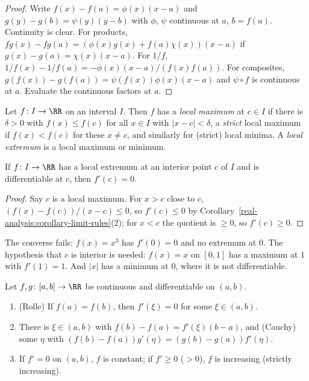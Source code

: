 \begin{proof}
Write $f(x) - f(a) = \phi(x)(x - a)$ and $g(y) - g(b) = \psi(y)(y - b)$ with $\phi$, $\psi$ continuous at $a$, $b = f(a)$. Continuity is clear. For products,
$fg(x) - fg(a) = (\phi(x)g(x) + f(a)\chi(x))(x - a)$ if $g(x) - g(a) = \chi(x)(x - a)$. For $1/f$, $1/f(x) - 1/f(a) = -\phi(x)(x - a)/(f(x)f(a))$. For composites,
$g(f(x)) - g(f(a)) = \psi(f(x))\phi(x)(x - a)$ and $\psi \circ f$ is continuous at $a$. Evaluate the continuous factors at $a$.
\end{proof}

\begin{definition}\label{real-analysis:definition-local-extremum}
Let $f \colon I \to \RR$ on an interval $I$. Then $f$ has a \emph{local maximum} at $c \in I$ if there is $\delta > 0$ with $f(x) \leq f(c)$ for all $x \in I$ with $|x - c| < \delta$, a \emph{strict} local maximum if
$f(x) < f(c)$ for these $x \neq c$, and similarly for (strict) local minima. A \emph{local extremum} is a local maximum or minimum.
\end{definition}

\begin{lemma}[Fermat]\label{real-analysis:lemma-fermat}
If $f \colon I \to \RR$ has a local extremum at an interior point $c$ of $I$ and is differentiable at $c$, then $f'(c) = 0$.
\end{lemma}

\begin{proof}
Say $c$ is a local maximum. For $x > c$ close to $c$, $(f(x) - f(c))/(x - c) \leq 0$, so $f'(c) \leq 0$ by Corollary~\ref{real-analysis:corollary-limit-rules}(2); for $x < c$ the quotient is $\geq 0$, so $f'(c) \geq 0$.
\end{proof}

\begin{counterexample}\label{real-analysis:counterexample-fermat}
The converse fails: $f(x) = x^3$ has $f'(0) = 0$ and no extremum at $0$. The hypothesis that $c$ is interior is needed: $f(x) = x$ on $[0, 1]$ has a maximum at $1$ with $f'(1) = 1$. And $|x|$ has a minimum at $0$,
where it is not differentiable.
\end{counterexample}

\begin{theorem}\label{real-analysis:theorem-mean-value}
Let $f, g \colon [a, b] \to \RR$ be continuous and differentiable on $(a, b)$.
\begin{enumerate}
\item (Rolle) If $f(a) = f(b)$, then $f'(\xi) = 0$ for some $\xi \in (a, b)$.
\item There is $\xi \in (a, b)$ with $f(b) - f(a) = f'(\xi)(b - a)$, and (Cauchy) some $\eta$ with $(f(b) - f(a))g'(\eta) = (g(b) - g(a))f'(\eta)$.
\item If $f' = 0$ on $(a, b)$, $f$ is constant; if $f' \geq 0$ ($> 0$), $f$ is increasing (strictly increasing).
\end{enumerate}
\end{theorem}

